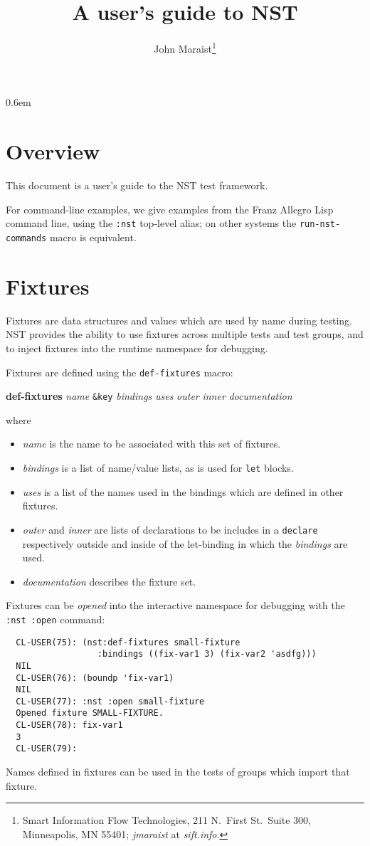\documentclass{article}
\title{A user's guide to NST}
\author{John Maraist\thanks{Smart Information Flow Technologies, 211 N.\ First St.\ Suite 300, Minneapolis, MN 55401; \textsl{jmaraist} at \textsl{sift.info}.}}
\begin{document}
\maketitle
\thispagestyle{empty}
\tableofcontents
\parskip 0.6em
\parindent 0pt
\section{Overview}
This document is a user's guide to the NST test framework.

For command-line examples, we give examples from the Franz Allegro
Lisp command line, using the \texttt{:nst} top-level alias; on other
systems the \texttt{run-nst-commands} macro is equivalent.

\section{Fixtures}
Fixtures are data structures and values which are used by name during
testing.  NST provides the ability to use fixtures across multiple
tests and test groups, and to inject fixtures into the runtime
namespace for debugging.

Fixtures are defined using the \texttt{def-fixtures} macro:
\begin{center}
\textbf{def-fixtures} \textit{name} \texttt{\&key}
\textit{bindings} \textit{uses} \textit{outer}
\textit{inner} \textit{documentation}
\end{center}
where
\begin{itemize}
\item \textit{name} is the name to be associated with this set of
  fixtures.
\item \textit{bindings} is a list of name/value lists, as is used for \texttt{let} blocks.
\item \textit{uses} is a list of the names used in the bindings which are defined in other fixtures.
\item \textit{outer} and \textit{inner} are lists of declarations to be includes in a \texttt{declare} respectively outside and inside of the let-binding in which the \textit{bindings} are used.
\item \textit{documentation} describes the fixture set.
\end{itemize}
Fixtures can be \emph{opened} into the interactive namespace for
debugging with the \texttt{:nst~:open} command:
\begin{verbatim}
  CL-USER(75): (nst:def-fixtures small-fixture
                  :bindings ((fix-var1 3) (fix-var2 'asdfg)))
  NIL
  CL-USER(76): (boundp 'fix-var1)
  NIL
  CL-USER(77): :nst :open small-fixture
  Opened fixture SMALL-FIXTURE.
  CL-USER(78): fix-var1
  3
  CL-USER(79): \end{verbatim}
%
Names defined in fixtures can be used in the tests of groups which
import that fixture.
\end{document}
